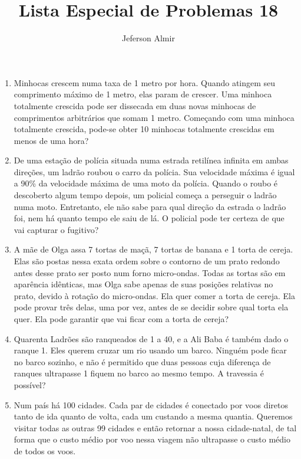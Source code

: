 \documentclass{article}
\title{Lista Especial de Problemas 18}
\author{Jeferson Almir}
\date{}
\begin{document}
\maketitle

\begin{enumerate}
    \item Minhocas crescem numa taxa de 1 metro por hora. Quando atingem seu comprimento máximo de 1 metro, elas param de crescer. Uma minhoca totalmente crescida pode ser dissecada em duas novas minhocas de comprimentos arbitrários que somam 1 metro. Começando com uma minhoca totalmente crescida, pode-se obter 10 minhocas totalmente crescidas em menos de uma hora?
    
    \item De uma estação de polícia situada numa estrada retilínea infinita em ambas direções, um ladrão roubou o carro da polícia. Sua velocidade máxima é igual a 90\% da velocidade máxima de uma moto da polícia. Quando o roubo é descoberto algum tempo depois, um policial começa a perseguir o ladrão numa moto. Entretanto, ele não sabe para qual direção da estrada o ladrão foi, nem há quanto tempo ele saiu de lá. O policial pode ter certeza de que vai capturar o fugitivo?
    
    \item A mãe de Olga assa 7 tortas de maçã, 7 tortas de banana e 1 torta de cereja. Elas são postas nessa exata ordem sobre o contorno de um prato redondo antes desse prato ser posto num forno micro-ondas. Todas as tortas são em aparência idênticas, mas Olga sabe apenas de suas posições relativas no prato, devido à rotação do micro-ondas. Ela quer comer a torta de cereja. Ela pode provar três delas, uma por vez, antes de se decidir sobre qual torta ela quer. Ela pode garantir que vai ficar com a torta de cereja?
    
    \item Quarenta Ladrões são ranqueados de 1 a 40, e a Ali Baba é também dado o ranque 1. Eles querem cruzar um rio usando um barco. Ninguém pode ficar no barco sozinho, e não é permitido que duas pessoas cuja diferença de ranques ultrapasse 1 fiquem no barco ao mesmo tempo. A travessia é possível?
    
    \item Num país há 100 cidades. Cada par de cidades é conectado por voos diretos tanto de ida quanto de volta, cada um custando a mesma quantia. Queremos visitar todas as outras 99 cidades e então retornar a nossa cidade-natal, de tal forma que o custo médio por voo nessa viagem não ultrapasse o custo médio de todos os voos.
    

\end{enumerate}
\end{document}
